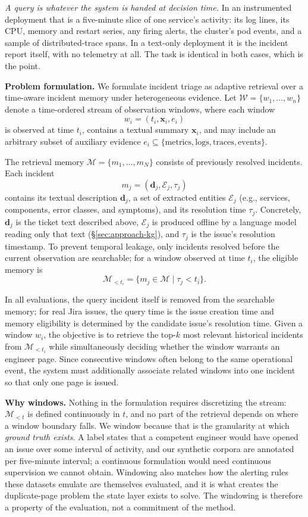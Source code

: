 \emph{A query is whatever the system is handed at decision time.} In an
instrumented deployment that is a five-minute slice of one service's activity:
its log lines, its CPU, memory and restart series, any firing alerts, the
cluster's pod events, and a sample of distributed-trace spans. In a text-only
deployment it is the incident report itself, with no telemetry at all. The task
is identical in both cases, which is the point.

\smallskip
\noindent\textbf{Problem formulation.}
We formulate incident triage as adaptive retrieval over a time-aware incident memory under heterogeneous evidence. Let
$\mathcal{W}=\{w_1,\ldots,w_n\}$ denote a time-ordered stream of observation
windows, where each window
\[
w_i=(t_i,\mathbf{x}_i,e_i)
\]
is observed at time $t_i$, contains a textual summary $\mathbf{x}_i$, and may
include an arbitrary subset of auxiliary evidence
$e_i\subseteq\{\text{metrics},\text{logs},\text{traces},\text{events}\}$.

The retrieval memory
$\mathcal{M}=\{m_1,\ldots,m_N\}$ consists of previously resolved incidents.
Each incident
\[
m_j=(\mathbf{d}_j,\mathcal{E}_j,\tau_j)
\]
contains its textual description $\mathbf{d}_j$, a set of extracted entities
$\mathcal{E}_j$ (e.g., services, components, error classes, and symptoms), and
its resolution time $\tau_j$. Concretely, $\mathbf{d}_j$ is the ticket text
described above, $\mathcal{E}_j$ is produced offline by a language model reading
only that text (\S\ref{sec:approach-kg}), and $\tau_j$ is the issue's resolution
timestamp. To prevent temporal leakage, only incidents
resolved before the current observation are searchable; for a window observed at
time $t_i$, the eligible memory is
\[
\mathcal{M}_{<t_i}=\{m_j\in\mathcal{M}\mid \tau_j<t_i\}.
\]

In all evaluations, the query incident itself is removed from the searchable memory; for real Jira issues, the query time is the issue creation time and memory eligibility is determined by the candidate issue’s resolution time. Given a window $w_i$, the objective is to retrieve the top-$k$ most relevant
historical incidents from $\mathcal{M}_{<t_i}$ while simultaneously deciding
whether the window warrants an engineer page. Since consecutive windows often belong to the same operational event, the system must additionally associate related windows into one incident so that only one page is issued.

\smallskip
\noindent\textbf{Why windows.} Nothing in the formulation requires discretizing
the stream: $\mathcal{M}_{<t}$ is defined continuously in $t$, and no part of the
retrieval depends on where a window boundary falls. We window because that is the
granularity at which \emph{ground truth exists}. A label states that a competent
engineer would have opened an issue over some interval of activity, and our
synthetic corpora are annotated per five-minute interval; a continuous
formulation would need continuous supervision we cannot obtain. Windowing also
matches how the alerting rules these datasets emulate are themselves evaluated,
and it is what creates the duplicate-page problem the state layer exists to
solve. The windowing is therefore a property of the evaluation, not a commitment
of the method.
